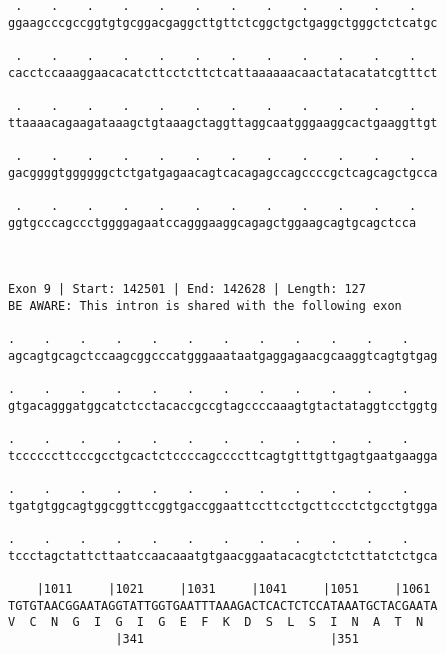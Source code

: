 \documentclass{article}
\begin{document}
\begin{Verbatim}
 .    .    .    .    .    .    .    .    .    .    .    .   
ggaagcccgccggtgtgcggacgaggcttgttctcggctgctgaggctgggctctcatgc
                                                            
 .    .    .    .    .    .    .    .    .    .    .    .   
cacctccaaaggaacacatcttcctcttctcattaaaaaacaactatacatatcgtttct
                                                            
 .    .    .    .    .    .    .    .    .    .    .    .   
ttaaaacagaagataaagctgtaaagctaggttaggcaatgggaaggcactgaaggttgt
                                                            
 .    .    .    .    .    .    .    .    .    .    .    .   
gacggggtggggggctctgatgagaacagtcacagagccagccccgctcagcagctgcca
                                                            
 .    .    .    .    .    .    .    .    .    .    .    .
ggtgcccagccctggggagaatccagggaaggcagagctggaagcagtgcagctcca
                                                         
                                                         
 
Exon 9 | Start: 142501 | End: 142628 | Length: 127
BE AWARE: This intron is shared with the following exon
 
.    .    .    .    .    .    .    .    .    .    .    .    
agcagtgcagctccaagcggcccatgggaaataatgaggagaacgcaaggtcagtgtgag
                                                            
.    .    .    .    .    .    .    .    .    .    .    .    
gtgacagggatggcatctcctacaccgccgtagccccaaagtgtactataggtcctggtg
                                                            
.    .    .    .    .    .    .    .    .    .    .    .    
tccccccttcccgcctgcactctccccagccccttcagtgtttgttgagtgaatgaagga
                                                            
.    .    .    .    .    .    .    .    .    .    .    .    
tgatgtggcagtggcggttccggtgaccggaattccttcctgcttccctctgcctgtgga
                                                            
.    .    .    .    .    .    .    .    .    .    .    .    
tccctagctattcttaatccaacaaatgtgaacggaatacacgtctctcttatctctgca
                                                            
    |1011     |1021     |1031     |1041     |1051     |1061 
TGTGTAACGGAATAGGTATTGGTGAATTTAAAGACTCACTCTCCATAAATGCTACGAATA
V  C  N  G  I  G  I  G  E  F  K  D  S  L  S  I  N  A  T  N  
               |341                          |351           
  

\end{Verbatim}
\end{document}
